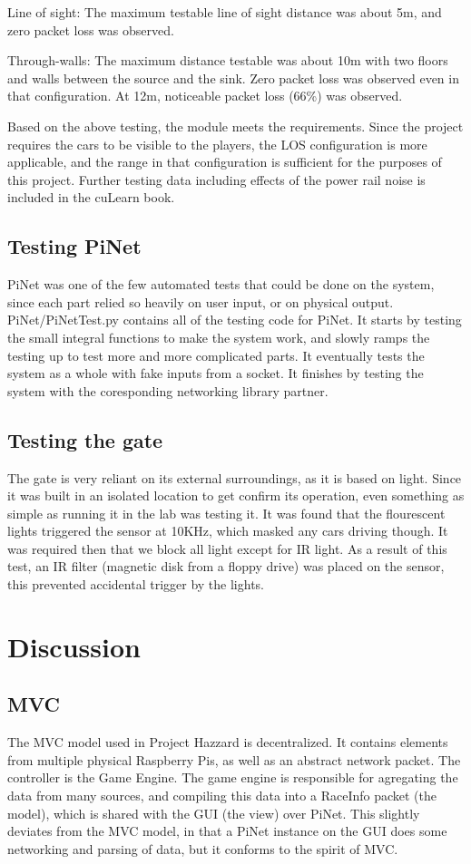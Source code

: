 \documentclass[letterpaper,fleqn]{article}
\begin{document}
Line of sight: The maximum testable line of sight distance was about 5m, and zero packet loss was observed.

Through-walls: The maximum distance testable was about 10m with two floors and walls between the source and the sink. Zero packet loss was observed even in that configuration. At 12m, noticeable packet loss (66\%) was observed.

Based on the above testing, the module meets the requirements. Since the project requires the cars to be visible to the players, the LOS configuration is more applicable, and the range in that configuration is sufficient for the purposes of this project. Further testing data including effects of the power rail noise is included in the cuLearn book.

\subsection{Testing PiNet}
PiNet was one of the few automated tests that could be done on the system, since each part relied so heavily on user input, or on physical output. 
PiNet/PiNetTest.py contains all of the testing code for PiNet. It starts by testing the small integral functions to make the system work, and slowly ramps the testing up to test more and more complicated parts. It eventually tests the system as a whole with fake inputs from a socket. It finishes by testing the system with the coresponding networking library partner.

\subsection{Testing the gate}
The gate is very reliant on its external surroundings, as it is based on light. Since it was built in an isolated location to get confirm its operation, even something as simple as running it in the lab was testing it. It was found that the flourescent lights triggered the sensor at 10KHz, which masked any cars driving though. It was required then that we block all light except for IR light. As a result of this test, an IR filter (magnetic disk from a floppy drive) was placed on the sensor, this prevented accidental trigger by the lights.

\section{Discussion}

\subsection{MVC}
The MVC model used in Project Hazzard is decentralized. It contains elements from multiple physical Raspberry Pis, as well as an abstract network packet. The controller is the Game Engine. The game engine is responsible for agregating the data from many sources, and compiling this data into a RaceInfo packet (the model), which is shared with the GUI (the view) over PiNet. This slightly deviates from the MVC model, in that a PiNet instance on the GUI does some networking and parsing of data, but it conforms to the spirit of MVC.
\end{document}
